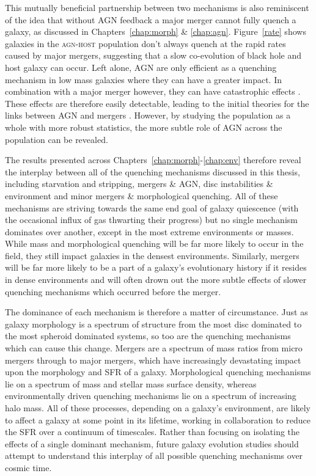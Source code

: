 This mutually beneficial partnership between two mechanisms is also reminiscent of the idea that without AGN feedback a major merger cannot fully quench a galaxy, as discussed in Chapters~\ref{chap:morph} \& \ref{chap:agn}. Figure~\ref{rate} shows galaxies in the \textsc{agn-host} population don't always quench at the rapid rates caused by major mergers, suggesting that a slow co-evolution of black hole and host galaxy can occur. Left alone, AGN are only efficient as a quenching mechanism in low mass galaxies where they can have a greater impact. In combination with a major merger however, they can have catastrophic effects \citep{conselice03, springel05b, hopkins08a}. These effects are therefore easily detectable, leading to the initial theories for the links between AGN and mergers \citep{merritt01, hopkins06b, hopkins08a, hopkins08b, peng07, jahnke11}. However, by studying the population as a whole with more robust statistics, the more subtle role of AGN across the population can be revealed. 

The results presented across Chapters~\ref{chap:morph}-\ref{chap:env} therefore reveal the interplay between all of the quenching mechanisms discussed in this thesis, including starvation and stripping, mergers \& AGN, disc instabilities \&  environment and minor mergers \& morphological quenching. All of these mechanisms are striving towards the same end goal of galaxy quiescence (with the occasional influx of gas thwarting their progress) but no single mechanism dominates over another, except in the most extreme environments or masses. While mass and morphological quenching will be far more likely to occur in the field, they still impact galaxies in the densest environments. Similarly, mergers will be far more likely to be a part of a galaxy's evolutionary history if it resides in dense environments and will often drown out the more subtle effects of slower quenching mechanisms which occurred before the merger. 

The dominance of each mechanism is therefore a matter of circumstance. Just as galaxy morphology is a spectrum of structure from the most disc dominated to the most spheroid dominated systems, so too are the quenching mechanisms which can cause this change. Mergers are a spectrum of mass ratios from micro mergers \citep{carlin16} through to major mergers, which have increasingly devastating impact upon the morphology and SFR of a galaxy. Morphological quenching mechanisms lie on a spectrum of mass and stellar mass surface density, whereas environmentally driven quenching mechanisms lie on a spectrum of increasing halo mass. All of these processes, depending on a galaxy's environment, are likely to affect a galaxy at some point in its lifetime, working in collaboration to reduce the SFR over a continuum of timescales. Rather than focusing on isolating the effects of a single  dominant mechanism, future galaxy evolution studies should attempt to understand this interplay of all possible quenching mechanisms over cosmic time. 

